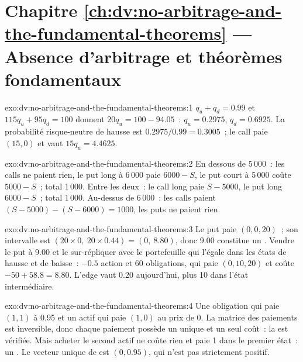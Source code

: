 \section*{Chapitre \ref{ch:dv:no-arbitrage-and-the-fundamental-theorems} --- Absence d'arbitrage et théorèmes fondamentaux}

\begin{solution}{exo:dv:no-arbitrage-and-the-fundamental-theorems:1}
$q_u+q_d=0.99$ et $115q_u+95q_d=100$ donnent $20q_u=100-94.05$~: $q_u=0.2975$,
$q_d=0.6925$. La probabilité risque-neutre de hausse est $0.2975/0.99=0.3005$~; le call
paie $(15,0)$ et vaut $15q_u=4.4625$.
\end{solution}

\begin{solution}{exo:dv:no-arbitrage-and-the-fundamental-theorems:2}
En dessous de 5\,000~: les calls ne paient rien, le put long à 6\,000 paie $6000-S$, le
put court à 5\,000 coûte $5000-S$~; total 1\,000. Entre les deux~: le call long paie $S-5000$, le
put long $6000-S$~; total 1\,000. Au-dessus de 6\,000~: les calls paient $(S-5000)-(S-6000)=1000$,
les puts ne paient rien.
\end{solution}

\begin{solution}{exo:dv:no-arbitrage-and-the-fundamental-theorems:3}
Le put paie $(0,0,20)$~; son intervalle est $(20\times0,\ 20\times0.44)=(0,\ 8.80)$,
donc 9.00 constitue un . Vendre le put à 9.00 et le sur-répliquer avec le
portefeuille qui l'égale dans les états de hausse et de baisse~: $-0.5$ action et 60 obligations,
qui paie $(0,10,20)$ et coûte $-50+58.8=8.80$. L'edge vaut 0.20 aujourd'hui, plus 10 dans
l'état intermédiaire.
\end{solution}

\begin{solution}{exo:dv:no-arbitrage-and-the-fundamental-theorems:4}
Une obligation qui paie $(1,1)$ à 0.95 et un actif qui paie $(1,0)$ au prix de 0. La matrice des
paiements est inversible, donc chaque paiement possède un unique  et un seul coût~:
la  est vérifiée. Mais acheter le second actif ne coûte rien et paie 1
dans le premier état~: un . Le vecteur unique de  est $(0,0.95)$, qui
n'est pas strictement positif.
\end{solution}

